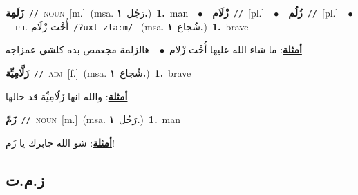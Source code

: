 \documentclass[10pt,a4paper,twoside]{article} %
\begin{document}
\begin{multicols}{2}
{\setlength\topsep{0pt}\textbf{\foreignlanguage{arabic}{زَلَمِة}}\ {\color{gray}\texttt{//}\color{black}}\ \textsc{noun}\ [m.]\ \color{gray}(msa. \foreignlanguage{arabic}{رَجُل}~\foreignlanguage{arabic}{\textbf{١.}})\color{black}\ \textbf{1.}~man\ \ $\bullet$\ \ \setlength\topsep{0pt}\textbf{\foreignlanguage{arabic}{زْلَام}}\ {\color{gray}\texttt{//}\color{black}}\ [pl.]\ \ $\bullet$\ \ \setlength\topsep{0pt}\textbf{\foreignlanguage{arabic}{زُلُم}}\ {\color{gray}\texttt{//}\color{black}}\ [pl.]\ \ $\bullet$\ \ \textsc{ph.} \color{gray} \foreignlanguage{arabic}{أُخْت زْلَام}\color{black}\ {\color{gray}\texttt{/{\sffamily ʔuxt zlaːm}/}\color{black}}\ \color{gray} (msa. \foreignlanguage{arabic}{شُجاع}~\foreignlanguage{arabic}{\textbf{١.}})\color{black}\ \textbf{1.}~brave\  \begin{flushright}\color{gray}\foreignlanguage{arabic}{\textbf{\underline{\foreignlanguage{arabic}{أمثلة}}}: ما شاء الله عليها أُخْت زْلام\ $\bullet$\ \  هالزلمة مجعمص بده كلشي عمزاجه}\end{flushright}\color{black}} \vspace{2mm}

{\setlength\topsep{0pt}\textbf{\foreignlanguage{arabic}{زَلَّامِيِّة}}\ {\color{gray}\texttt{//}\color{black}}\ \textsc{adj}\ [f.]\ \color{gray}(msa. \foreignlanguage{arabic}{شُجاع}~\foreignlanguage{arabic}{\textbf{١.}})\color{black}\ \textbf{1.}~brave\  \begin{flushright}\color{gray}\foreignlanguage{arabic}{\textbf{\underline{\foreignlanguage{arabic}{أمثلة}}}: والله انها زَلّامِيِّة قد حالها}\end{flushright}\color{black}} \vspace{2mm}

{\setlength\topsep{0pt}\textbf{\foreignlanguage{arabic}{زَمّ}}\ {\color{gray}\texttt{//}\color{black}}\ \textsc{noun}\ [m.]\ \color{gray}(msa. \foreignlanguage{arabic}{رَجُل}~\foreignlanguage{arabic}{\textbf{١.}})\color{black}\ \textbf{1.}~man\  \begin{flushright}\color{gray}\foreignlanguage{arabic}{\textbf{\underline{\foreignlanguage{arabic}{أمثلة}}}: شو الله جابرك يا زَم!}\end{flushright}\color{black}} \vspace{2mm}

\vspace{-3mm}
\subsection*{\color{blue}\foreignlanguage{arabic}{ز.م.ت}\color{blue}{}} 


\end{multicols}
\end{document}
